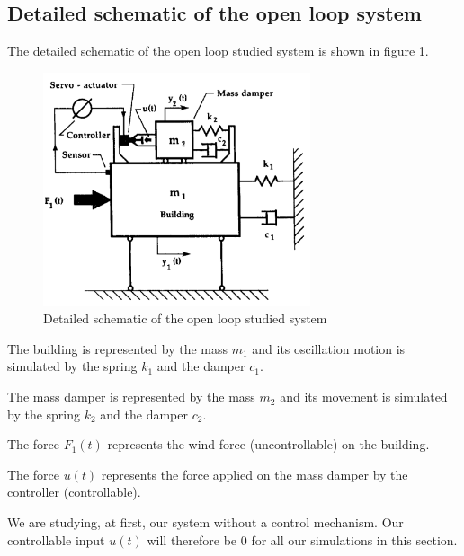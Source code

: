 \subsection{Detailed schematic of the open loop system}
The detailed schematic of the open loop studied system is shown in figure \ref{fig:detailed_schematic}.
\begin{figure}[H]
    \centering
    \includegraphics[width=0.7\textwidth]{resources/pdf/schema.pdf}
    \caption{Detailed schematic of the open loop studied system \cite{science_direct}}
    \label{fig:detailed_schematic}
\end{figure}
The building is represented by the mass $m_1$ and its oscillation motion is simulated by the spring $k_1$ and the damper $c_1$.\par
The mass damper is represented by the mass $m_2$ and its movement is simulated by the spring $k_2$ and the damper $c_2$.\par
The force $F_1(t)$ represents the wind force (uncontrollable) on the building.\par
The force $u(t)$ represents the force applied on the mass damper by the controller (controllable).\par
We are studying, at first, our system without a control mechanism. Our controllable input $u(t)$ will therefore be \num{0} for all our simulations in this section.
